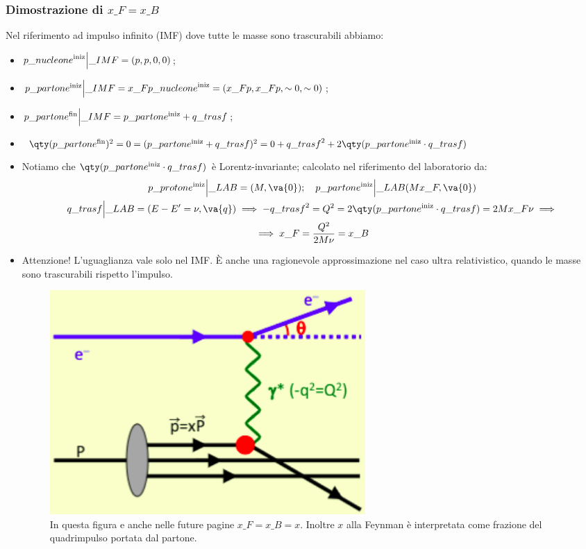 \subsubsection{Dimostrazione di $x\_F=x\_B$}
Nel riferimento ad impulso infinito (IMF) dove tutte le masse sono trascurabili abbiamo:
\begin{itemize}
    \item $p\_{nucleone}^{\textnormal{iniz}}\Big|\_{IMF}=(p,p,0,0)$;
    \item $p\_{partone}^{\textnormal{iniz}}\Big|\_{IMF}=x\_F p\_{nucleone}^{\textnormal{iniz}}=(x\_Fp,x\_Fp,\sim0,\sim0)$;
    \item $p\_{partone}^{\textnormal{fin}}\Big|\_{IMF}=p\_{partone}^{\textnormal{iniz}}+q\_{trasf}$;
    \item $\qty(p\_{partone}^{\textnormal{fin}})^2=0=(p\_{partone}^{\textnormal{iniz}}+q\_{trasf})^2=0+q\_{trasf}^2+2\qty(p\_{partone}^{\textnormal{iniz}}\cdot q\_{trasf})$
    \item Notiamo che $\qty(p\_{partone}^{\textnormal{iniz}}\cdot q\_{trasf})$ è Lorentz-invariante; calcolato nel riferimento del laboratorio da:
    \begin{gather*}
        p\_{protone}^{\textnormal{iniz}}\Big|\_{LAB}=(M,\va{0});\quad p\_{partone}^{\textnormal{iniz}}\Big|\_{LAB}(Mx\_F,\va{0})\\
        q\_{trasf}\Big|\_{LAB}=(E-E'=\nu,\va{q})\implies -q\_{trasf}^2=Q^2=2\qty(p\_{partone}^{\textnormal{iniz}}\cdot q\_{trasf})=2Mx\_F\nu\implies\\
        \implies x\_F=\frac{Q^2}{2M\nu}=x\_B
        \end{gather*}
    \item Attenzione! L'uguaglianza vale solo nel IMF. È anche una ragionevole approssimazione nel caso ultra relativistico, quando le masse sono trascurabili rispetto l'impulso. 
    \begin{figure}[H]
        \centering
        \includegraphics[width=0.6\textwidth]{immagini/fig_x_proton_parton_e.png}
        \caption{In questa figura e anche nelle future pagine $x\_F=x\_B=x$. Inoltre $x$ alla Feynman è interpretata come frazione del quadrimpulso portata dal partone.}
    \end{figure}
\end{itemize}
